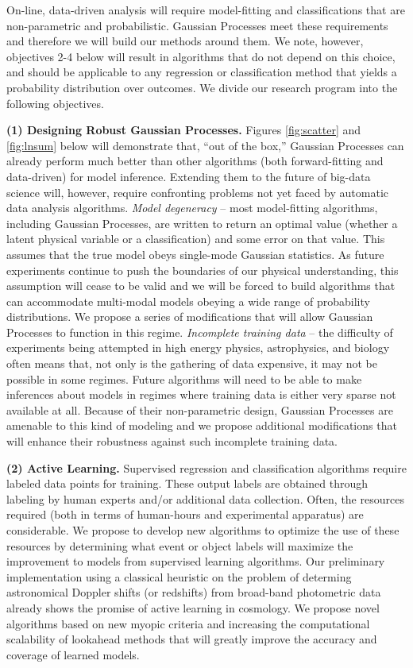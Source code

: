 \documentclass[useAMS,usenatbib,tightenlines,11pt,preprint]{aastex}
\begin{document}
On-line, data-driven analysis will require model-fitting and
classifications that are non-parametric and probabilistic.  Gaussian
Processes meet these requirements and therefore we will build our methods
around them.  We note, however, objectives 2-4 below will result in algorithms that do
not depend on this choice, and should be applicable to any
regression or classification method that yields a probability distribution
over outcomes.  We divide our
research program into the following objectives.

{\bf (1) Designing Robust Gaussian Processes.}  Figures \ref{fig:scatter}
and \ref{fig:lnsum} below will demonstrate that, ``out of the box,'' Gaussian
Processes can already perform much better than other algorithms (both
forward-fitting and data-driven) for model inference. Extending them
to the future of big-data science will, however, require confronting problems not yet
faced by automatic data analysis algorithms. {\it Model degeneracy} -- most model-fitting algorithms, including Gaussian
Processes, are written to return an optimal value (whether a latent physical
variable or a classification) and some error on that value.  This assumes that
the true model obeys single-mode Gaussian statistics.  As future experiments
continue to push the boundaries of our physical understanding, this assumption
will cease to be valid and we will be forced to build algorithms that can
accommodate multi-modal models obeying a wide range of probability
distributions.  We propose a series of modifications that will allow Gaussian
Processes to function in this regime.
{\it Incomplete training data} -- the difficulty of experiments being attempted
in high energy physics, astrophysics, and biology often means that, not only is
the gathering of data expensive, it may not be possible in some regimes.  Future
algorithms will need to be able to make inferences about models in regimes where
training data is either very sparse not available at all.  Because of their
non-parametric design, Gaussian Processes are amenable to this kind of
modeling and we propose additional modifications that will enhance their
robustness against such incomplete training data.

{\bf (2) Active Learning.} Supervised regression and classification algorithms
require labeled data points for training.  These output labels are obtained
through labeling by human experts and/or additional data collection.
Often, the resources required (both in terms of human-hours and
experimental apparatus) are considerable.  We propose to develop new
algorithms to optimize the use of these resources by determining what event
or object labels will maximize the improvement to models from supervised
learning algorithms.  Our preliminary implementation using a classical
heuristic on the problem of determing astronomical Doppler shifts (or
redshifts) from broad-band photometric data already shows the promise of
active learning in cosmology.  We propose novel algorithms based on new
myopic criteria and increasing the computational scalability of lookahead
methods that will greatly improve the accuracy and coverage of learned
models.
\end{document}
